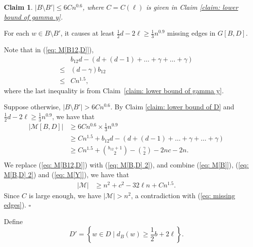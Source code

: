 \documentclass[12pt]{article}%
\newtheorem{claim}[theorem]{Claim}
\newenvironment{proof}{{\noindent\it Proof.}}{\hfill $\square$\par}
\begin{document}
\begin{claim}\label{claim: B setminus B'}
	$|B \setminus B' | \le 6C n^{0.6}$, where $C = C(\ell)$ is given in Claim \ref{claim: lower bound of gamma y}.
\end{claim}

\begin{proof}
	For each $w \in B\setminus B'$, it causes at least $\frac{1}{2}d - 2\ell \ge \frac{1}{3}n^{0.9}$ missing edges in $G[B,D]$.

	Note that in (\ref{eq: M[B12,D]}),
	\begin{equation*}
	\begin{aligned}
				 & b_{12}d - (d + (d-1) + \ldots + \gamma + \ldots + \gamma )\\
		\le & (d-\gamma)b_{12}\\
		\le & Cn^{1.5},
	\end{aligned}
	\end{equation*}
	where the last inequality is from Claim~\ref{claim: lower bound of gamma y}.

	Suppose otherwise, $|B \setminus B' | >6C n^{0.6}$. By Claim \ref{claim: lower bound of D} and $\frac{1}{2}d - 2\ell \ge \frac{1}{3}n^{0.9}$,
	 we have that
	\begin{equation}\label{eq: M[B,D] 2}
	\begin{aligned}
		|\mathcal{M}[B,D]| & \ge 6C n^{0.6} \times\frac{1}{3}n^{0.9} \\
& \ge  C n^{1.5} +  b_{12}d - (d + (d-1) + \ldots + \gamma + \ldots + \gamma )\\
		& \ge  C n^{1.5} + \binom{b_{12}+1}{2} - \binom{\gamma}{2} - 2nc - 2n.\\
	\end{aligned}
	\end{equation}
We replace (\ref{eq: M[B12,D]}) with (\ref{eq: M[B,D] 2}), and combine (\ref{eq: M[B]}), (\ref{eq: M[B,D] 2}) and (\ref{eq: M[Y]}), we have that
	\begin{equation*}
	\begin{aligned}
		|\mathcal{M}| &\ge n^2 + c^2 - 32\ell n + C n^{1.5}.
	\end{aligned}
	\end{equation*}
	Since $C$ is large enough, we have $|\mathcal{M}| > n^2$, a contradiction with (\ref{eq: missing edges}).
\end{proof}

Define
\[
D' = \left\{w \in D \mid d_B(w) \ge \frac{1}{2} b +2\ell \right\}.
\]
\end{document}
